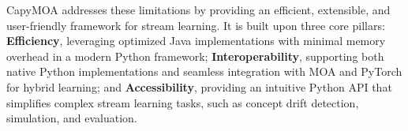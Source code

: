 CapyMOA addresses these limitations by providing an efficient, extensible, and user-friendly framework for stream learning. It is built upon three core pillars: 
\textbf{Efficiency}, leveraging optimized Java implementations with minimal memory overhead in a modern Python framework; \textbf{Interoperability}, supporting both native Python implementations and seamless integration with MOA and PyTorch for hybrid learning; and \textbf{Accessibility}, providing an intuitive Python API that simplifies complex stream learning tasks, such as concept drift detection, simulation, and evaluation. 



